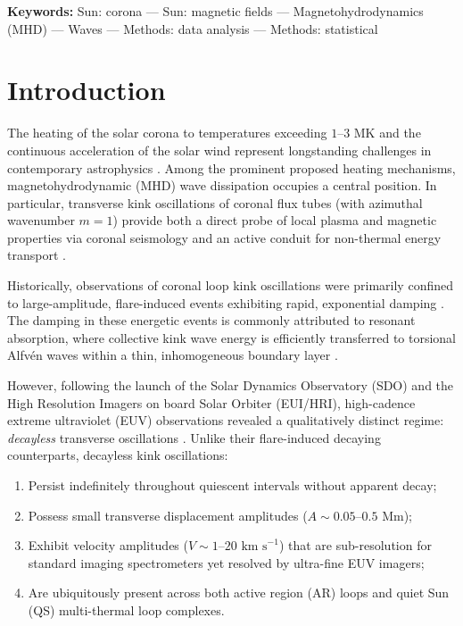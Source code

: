 \documentclass[11pt,a4paper]{article}
\begin{document}
\vspace{0.5em}
\noindent \textbf{Keywords:} Sun: corona --- Sun: magnetic fields --- Magnetohydrodynamics (MHD) --- Waves --- Methods: data analysis --- Methods: statistical

\section{Introduction}

The heating of the solar corona to temperatures exceeding $1\text{--}3\text{ MK}$ and the continuous acceleration of the solar wind represent longstanding challenges in contemporary astrophysics \citep{Aschwanden2002, VanDoorsselaere2008}. Among the prominent proposed heating mechanisms, magnetohydrodynamic (MHD) wave dissipation occupies a central position. In particular, transverse kink oscillations of coronal flux tubes (with azimuthal wavenumber $m=1$) provide both a direct probe of local plasma and magnetic properties via coronal seismology and an active conduit for non-thermal energy transport \citep{Nakariakov2001}.

Historically, observations of coronal loop kink oscillations were primarily confined to large-amplitude, flare-induced events exhibiting rapid, exponential damping \citep{Aschwanden2002, Nechaeva2019}. The damping in these energetic events is commonly attributed to resonant absorption, where collective kink wave energy is efficiently transferred to torsional Alfvén waves within a thin, inhomogeneous boundary layer \citep{VanDoorsselaere2008}.

However, following the launch of the Solar Dynamics Observatory (SDO) and the High Resolution Imagers on board Solar Orbiter (EUI/HRI), high-cadence extreme ultraviolet (EUV) observations revealed a qualitatively distinct regime: \textit{decayless} transverse oscillations \citep{Wang2012, Anfinogentov2013, Anfinogentov2015, Shrivastav2024}. Unlike their flare-induced decaying counterparts, decayless kink oscillations:
\begin{enumerate}
    \item Persist indefinitely throughout quiescent intervals without apparent decay;
    \item Possess small transverse displacement amplitudes ($A \sim 0.05\text{--}0.5\text{ Mm}$);
    \item Exhibit velocity amplitudes ($V \sim 1\text{--}20\text{ km s}^{-1}$) that are sub-resolution for standard imaging spectrometers yet resolved by ultra-fine EUV imagers;
    \item Are ubiquitously present across both active region (AR) loops and quiet Sun (QS) multi-thermal loop complexes.
\end{enumerate}
\end{document}
